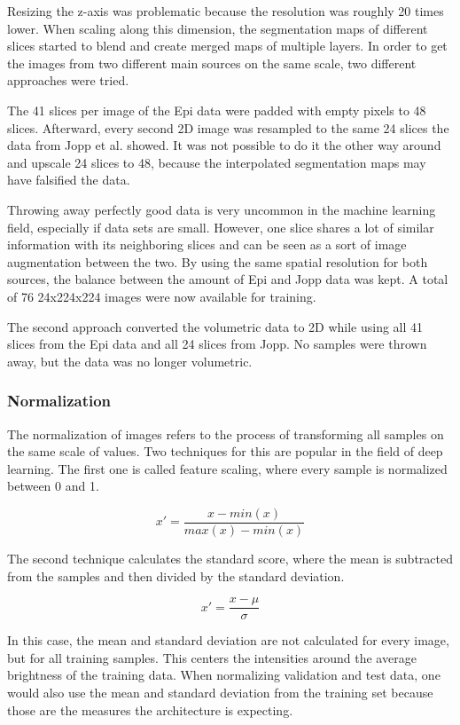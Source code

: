 Resizing the z-axis was problematic because the resolution was roughly 20 times lower. When scaling along this dimension, the segmentation maps of different slices started to blend and create merged maps of multiple layers. In order to get the images from two different main sources on the same scale, two different approaches were tried.

The 41 slices per image of the Epi data were padded with empty pixels to 48 slices. Afterward, every second 2D image was resampled to the same 24 slices the data from Jopp et al. showed. It was not possible to do it the other way around and upscale 24 slices to 48, because the interpolated segmentation maps may have falsified the data.

Throwing away perfectly good data is very uncommon in the machine learning field, especially if data sets are small. However, one slice shares a lot of similar information with its neighboring slices and can be seen as a sort of image augmentation between the two. By using the same spatial resolution for both sources, the balance between the amount of Epi and Jopp data was kept. A total of 76 24x224x224 images were now available for training.

The second approach converted the volumetric data to 2D while using all 41 slices from the Epi data and all 24 slices from Jopp. No samples were thrown away, but the data was no longer volumetric. 

\subsubsection{Normalization}

The normalization of images refers to the process of transforming all samples on the same scale of values. Two techniques for this are popular in the field of deep learning. The first one is called feature scaling, where every sample is normalized between 0 and 1.

\begin{figure}[H]
\[x' = \frac {x - min(x)}{max(x) - min(x)}\]
\end{figure}

The second technique calculates the standard score, where the mean is subtracted from the samples and then divided by the standard deviation.

\begin{figure}[H]
\[x' = \frac {x - \mu}{\sigma}\]
\end{figure}

In this case, the mean and standard deviation are not calculated for every image, but for all training samples. This centers the intensities around the average brightness of the training data. When normalizing validation and test data, one would also use the mean and standard deviation from the training set because those are the measures the architecture is expecting.

